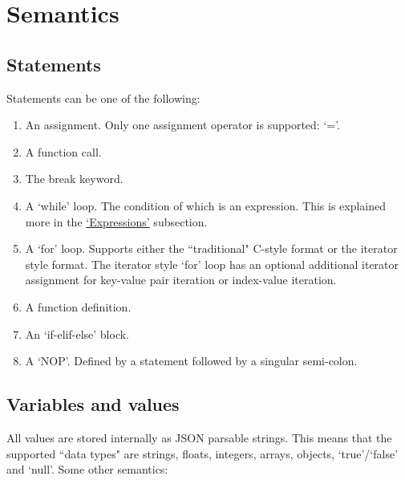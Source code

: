 \documentclass[12pt, letterpaper]{article}
\begin{document}
\section{Semantics}

\subsection{Statements}

Statements can be one of the following:

\begin{center}
    \begin{enumerate}
        \item An assignment. Only one assignment operator is supported: `='.
        \item A function call.
        \item The break keyword.
        \item A `while' loop. The condition of which is an expression. This is explained more in the \hyperref[sec:expressions]{`Expressions'} subsection.
        \item A `for' loop. Supports either the ``traditional" C-style format or the iterator style format. The iterator style `for' loop has an optional additional iterator assignment for key-value pair iteration or index-value iteration.
        \item A function definition.
        \item An `if-elif-else' block.
        \item A `NOP'. Defined by a statement followed by a singular semi-colon.
    \end{enumerate}
\end{center}

\subsection{Variables and values}

All values are stored internally as JSON parsable strings. This means that the supported ``data types" are strings, floats, integers, arrays, objects, `true'/`false' and `null'. Some other semantics:
\end{document}

